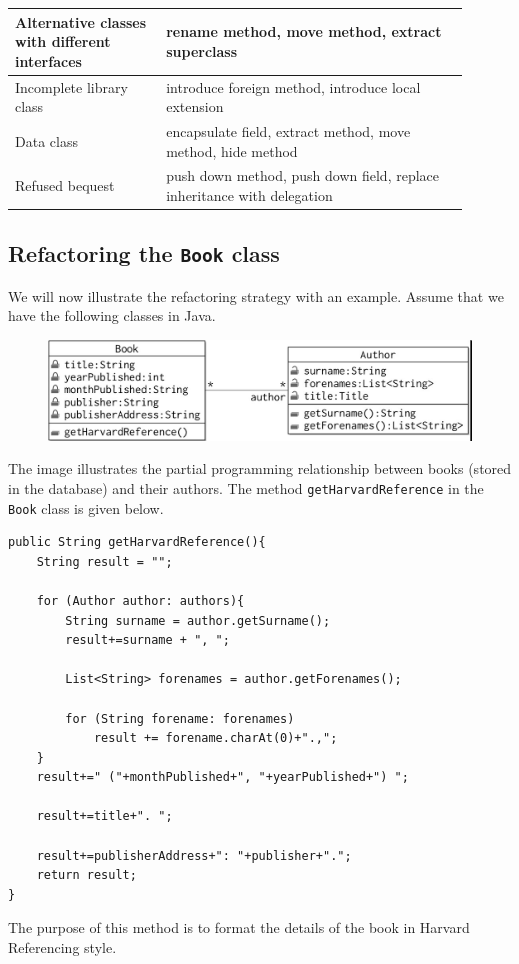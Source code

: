 \documentclass[a4paper, openany]{memoir}
\begin{document}
\begin{longtable}{p{0.3\linewidth} p{0.6\linewidth}}
    \hline
    Alternative classes with different interfaces & rename method, move method, extract superclass \\
    \hline
    Incomplete library class & introduce foreign method, introduce local extension \\
    \hline
    Data class & encapsulate field, extract method, move method, hide method \\
    \hline
    Refused bequest & push down method, push down field, replace inheritance with delegation \\
    \hline
\end{longtable}

\subsection{Refactoring the \texttt{Book} class}
We will now illustrate the refactoring strategy with an example. Assume that we have the following classes in Java.
\begin{figure}[H]
    \centering
    \includegraphics[scale=0.35]{src/16.2 book class before.png}
\end{figure}
\noindent The image illustrates the partial programming relationship between books (stored in the database) and their authors. The method \texttt{getHarvardReference} in the \texttt{Book} class is given below.
\begin{verbatim}
public String getHarvardReference(){
    String result = "";
    
    for (Author author: authors){
        String surname = author.getSurname();
        result+=surname + ", ";

        List<String> forenames = author.getForenames();
    
        for (String forename: forenames)
            result += forename.charAt(0)+".,";
    }
    result+=" ("+monthPublished+", "+yearPublished+") ";
    
    result+=title+". ";
    
    result+=publisherAddress+": "+publisher+".";
    return result;
}
\end{verbatim}
The purpose of this method is to format the details of the book in Harvard Referencing style. 
\end{document}
